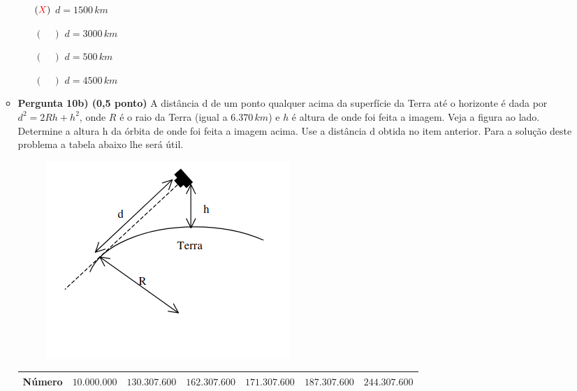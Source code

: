 \documentclass[a4paper, 12pt]{article}
\newcommand{\red}[1]{\textcolor{red}{#1}}
\begin{document}
\begin{flushleft}
\begin{itemize}
\begin{itemize}
\begin{figure}[H]
                    \end{figure}
                    \begin{itemize}
                        \item[$(\red{X})$] $d = 1500 \, km$
                        \item[$(\quad)$] $d = 3000 \, km$
                        \item[$(\quad)$] $d = 500 \, km$
                        \item[$(\quad)$] $d = 4500 \, km$
                    \end{itemize}
                \item \textbf{Pergunta 10b) (0,5 ponto)} A distância d de um ponto qualquer acima da superfície da Terra até o horizonte é dada por $d^2 = 2Rh + h^2$, onde $R$ é o raio da Terra (igual a $6.370 \, km$) e $h$ é altura de onde foi feita a imagem. Veja a figura ao lado. Determine a altura h da órbita de onde foi feita a imagem acima. Use a distância d obtida no item anterior. Para a solução deste problema a tabela abaixo lhe será útil.
                    \begin{figure}[H]
                        \centering
                        \includegraphics[scale=0.5]{img/10b.png}
                    \end{figure}
                    \begin{center} \begin{tabular}
                    {
                        |M{0.1\textwidth}|M{0.11\textwidth}|M{0.11\textwidth}|M{0.11\textwidth}|M{0.11\textwidth}|M{0.11\textwidth}|M{0.11\textwidth}|
                    }
                        \hline
                        Número & $10.000.000$ & $130.307.600$ & $162.307.600$ & $171.307.600$ & $187.307.600$ & $244.307.600$ \\ \hline

\end{tabular}
\end{center}
\end{itemize}
\end{itemize}
\end{flushleft}
\end{document}
